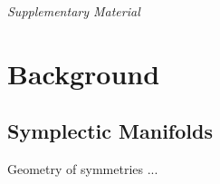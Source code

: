 \documentclass[beamer,10pt]{standalone}
\begin{document}

\begin{frame}
	\begin{center}
	\Huge\emph{Supplementary Material}
	\end{center}
\end{frame}
\note[itemize]{
	\item
}
\addtocounter{framenumber}{-1}





\section{Background}



\subsection{Symplectic Manifolds}


\begin{frame}{Geometry of symmetries}\label{frame:geometrysymmetries}
	...		
\end{frame}
\note[itemize]{
	\item
}

\end{document}
